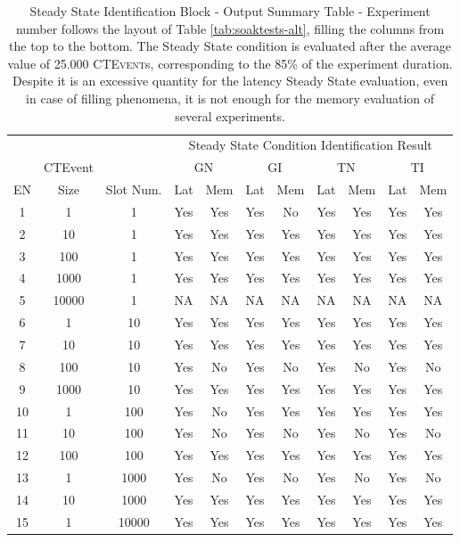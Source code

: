 \begin{table}[htb]
\centering
\scriptsize
 \begin{tabular}{c|c|c|cc|cc|cc|cc}
	  	\hline
	  	&&&\multicolumn{8}{c}{Steady State Condition Identification Result}  \\
	  	&CTEvent&&\multicolumn{2}{c}{GN}|&\multicolumn{2}{c}{GI}|&\multicolumn{2}{c}{TN}|&\multicolumn{2}{c}{TI}  \\
	  	EN&Size& Slot Num.&Lat&Mem&Lat&Mem&Lat&Mem&Lat&Mem  \\
		\hline
		\hline
		 1&1&1&Yes&Yes&Yes&No&Yes&Yes&Yes&Yes\\
		 2&10&1&Yes&Yes&Yes&Yes&Yes&Yes&Yes&Yes\\
		 3&100&1&Yes&Yes&Yes&Yes&Yes&Yes&Yes&Yes\\
		 4&1000&1&Yes&Yes&Yes&Yes&Yes&Yes&Yes&Yes\\
		 5&10000&1&NA&NA&NA&NA&NA&NA&NA&NA\\
		 6&1&10&Yes&Yes&Yes&Yes&Yes&Yes&Yes&Yes\\
		 7&10&10&Yes&Yes&Yes&Yes&Yes&Yes&Yes&Yes\\
		 8&100&10&Yes&No&Yes&No&Yes&No&Yes&No\\
		 9&1000&10&Yes&Yes&Yes&Yes&Yes&Yes&Yes&Yes\\
		 10&1&100&Yes&No&Yes&Yes&Yes&Yes&Yes&Yes\\
		 11&10&100&Yes&No&Yes&No&Yes&No&Yes&No\\
		 12&100&100&Yes&Yes&Yes&Yes&Yes&Yes&Yes&Yes\\
		 13&1&1000&Yes&No&Yes&No&Yes&No&Yes&No\\
		 14&10&1000&Yes&Yes&Yes&Yes&Yes&Yes&Yes&Yes\\
		 15&1&10000&Yes&Yes&Yes&Yes&Yes&Yes&Yes&Yes\\

		\hline 
 \end{tabular}
 \caption[Steady State Identification Block - Output Summary Table]{Steady State Identification Block - Output Summary Table - Experiment number follows the layout of Table \ref{tab:soaktests-alt}, filling the columns from the top to the bottom. The Steady State condition is evaluated after the average value of  25.000 \textsc{CTEvent}s,  corresponding to the 85\% of the experiment duration. Despite it is an excessive quantity for the latency Steady State evaluation, even in case of filling phenomena, it is not enough for the memory evaluation of several experiments.}
 \label{tab:ss-cond}
\end{table}